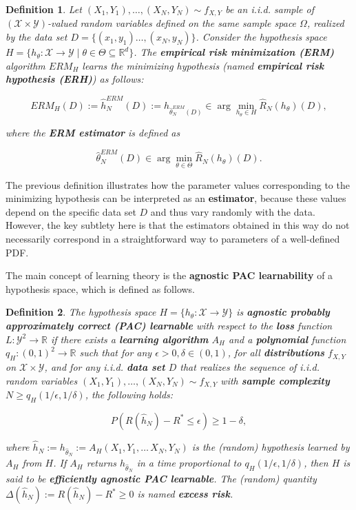 \documentclass{report}
\newtheorem{definition}{Definition}[chapter]
\begin{document}
\begin{definition}
Let $(X_1, Y_1),\dots,(X_N, Y_N) \sim f_{X,Y}$ be an i.i.d. sample of $(\mathcal{X} \times \mathcal{Y})$-valued random variables defined on the same sample space $\Omega$, realized by the data set $D =\{(x_1, y_1)\dots,(x_N,y_N)\}$. Consider the hypothesis space $H = \{h_\theta : \mathcal{X} \to \mathcal{Y} \mid\theta\in\Theta\subseteq\mathbb{R}^d\}$. The \textbf{empirical risk minimization (ERM)} algorithm $ERM_H$ learns the minimizing hypothesis (named \textbf{empirical risk hypothesis (ERH)}) as follows:

\begin{equation}
ERM_H(D) := \hat{h}_N^{ERM}(D) := h_{\hat{\theta}^{ERM}_N(D)} \in \arg \min_{h_\theta \in H} \hat{R}_N(h_\theta)(D),
\end{equation}

where the \textbf{ERM estimator} is defined as

\begin{equation}
\hat{\theta}^{ERM}_N(D) \in \arg\min_{\theta \in \Theta}\hat{R}_N(h_\theta)(D).
\end{equation}
\end{definition}

The previous definition illustrates how the parameter values corresponding to the minimizing hypothesis can be interpreted as an \textbf{estimator}, because these values depend on the specific data set $D$ and thus vary randomly with the data. However, the key subtlety here is that the estimators obtained in this way do not necessarily correspond in a straightforward way to parameters of a well-defined PDF.

The main concept of learning theory is the \textbf{agnostic PAC learnability} of a hypothesis space, which is defined as follows.

\begin{definition}
The hypothesis space $H = \{h_\theta : \mathcal{X} \to \mathcal{Y}\}$ is \textbf{agnostic probably approximately correct (PAC) learnable} with respect to the \textbf{loss} function $L : \mathcal{Y}^2 \to \mathbb{R}$ if there exists a \textbf{learning algorithm} $A_H$ and a \textbf{polynomial} function $q_H : (0,1) ^2 \to \mathbb{R}$ such that for any $\epsilon > 0,\delta \in (0,1)$, for all \textbf{distributions} $f_{X,Y}$ on $\mathcal{X} \times \mathcal{Y}$, and for any i.i.d. \textbf{data set} $D$ that realizes the sequence of i.i.d. random variables $(X_1, Y_1),\dots,(X_N, Y_N)\sim f_{X,Y}$ with \textbf{sample complexity} $N\geq q_H(1/\epsilon,1/\delta)$, the following holds:

\begin{equation}
P(R(\hat{h}_N) - R^* \leq \epsilon) \geq 1- \delta,
\end{equation}

where $\hat{h}_N := h_{\hat{\theta}_N} := A_H(X_1, Y_1,\dots\,X_N, Y_N)$ is the (random) hypothesis learned by $A_H$ from $H$. If $A_H$ returns $h_{\hat{\theta}_N}$ in a time proportional to $q_H(1/\epsilon,1/\delta)$, then $H$ is said to be \textbf{efficiently agnostic PAC learnable}. The (random) quantity $\Delta(\hat{h}_N) := R(\hat{h}_N) - R^* \geq 0$ is named \textbf{excess risk}.
\end{definition}
\end{document}
